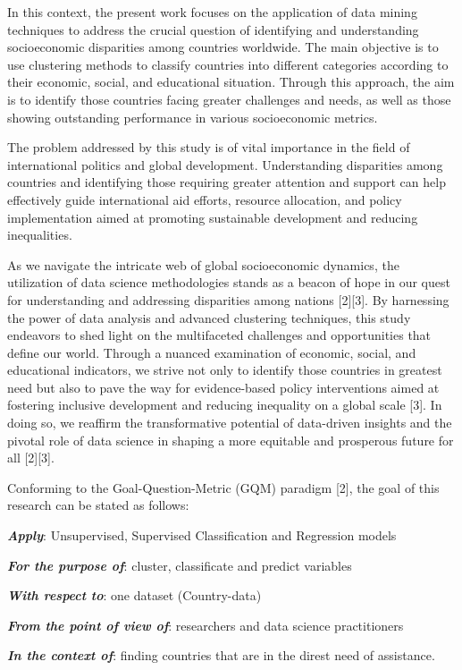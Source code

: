 \documentclass{article}
\begin{document}
\begin{multicols}{2}
In this context, the present work focuses on the application of data mining techniques to address the crucial question of identifying and understanding socioeconomic disparities among countries worldwide. The main objective is to use clustering methods to classify countries into different categories according to their economic, social, and educational situation. Through this approach, the aim is to identify those countries facing greater challenges and needs, as well as those showing outstanding performance in various socioeconomic metrics.

The problem addressed by this study is of vital importance in the field of international politics and global development. Understanding disparities among countries and identifying those requiring greater attention and support can help effectively guide international aid efforts, resource allocation, and policy implementation aimed at promoting sustainable development and reducing inequalities.

As we navigate the intricate web of global socioeconomic dynamics, the utilization of data science methodologies stands as a beacon of hope in our quest for understanding and addressing disparities among nations [2][3]. By harnessing the power of data analysis and advanced clustering techniques, this study endeavors to shed light on the multifaceted challenges and opportunities that define our world. Through a nuanced examination of economic, social, and educational indicators, we strive not only to identify those countries in greatest need but also to pave the way for evidence-based policy interventions aimed at fostering inclusive development and reducing inequality on a global scale [3]. In doing so, we reaffirm the transformative potential of data-driven insights and the pivotal role of data science in shaping a more equitable and prosperous future for all [2][3].

Conforming to the Goal-Question-Metric (GQM) paradigm [2], the goal of this research can be stated as follows:

\textbf{\textit{Apply}}: Unsupervised, Supervised Classification and Regression models

\textbf{\textit{For the purpose of}}: cluster, classificate and predict variables

\textbf{\textit{With respect to}}: one dataset (Country-data)

\textbf{\textit{From the point of view of}}: researchers and data science practitioners

\textbf{\textit{In the context of}}: finding countries that are in the direst need of assistance.


\end{multicols}
\end{document}
